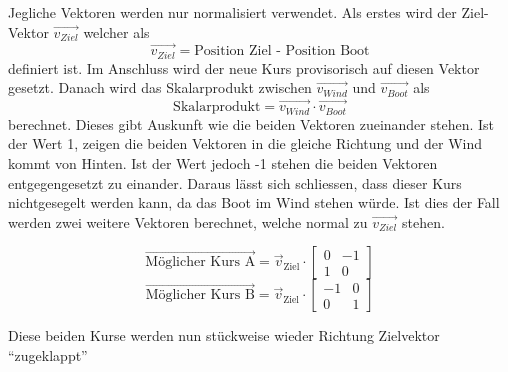 Jegliche Vektoren werden nur normalisiert verwendet. Als erstes wird der Ziel-Vektor $\Vec{v_{Ziel}}$ welcher als $$\Vec{v_{Ziel}} = \text{Position Ziel - Position Boot}$$ definiert ist. Im Anschluss wird der neue Kurs provisorisch auf diesen Vektor gesetzt.
Danach wird das Skalarprodukt zwischen $\Vec{v_{Wind}}$ und $\Vec{v_{Boot}}$ als $$\text{Skalarprodukt} = \Vec{v_{Wind}} \cdot \Vec{v_{Boot}}$$ berechnet. Dieses gibt Auskunft wie die beiden Vektoren zueinander stehen. Ist der Wert 1, zeigen die beiden Vektoren in die gleiche Richtung und der Wind kommt von Hinten. Ist der Wert jedoch -1 stehen die beiden Vektoren entgegengesetzt zu einander. Daraus lässt sich schliessen, dass dieser Kurs nichtgesegelt werden kann, da das Boot im Wind stehen würde. Ist dies der Fall werden zwei weitere Vektoren berechnet, welche normal zu $\Vec{v_{Ziel}}$ stehen. 

$$\vec{\text{Möglicher Kurs A}} = \vec{v}_{\text{Ziel}}  \cdot \begin{bmatrix}0 & -1 \\ 1 & 0\end{bmatrix} $$
$$\vec{\text{Möglicher Kurs B}} = \vec{v}_{\text{Ziel}} \cdot \begin{bmatrix}-1 & 0 \\ 0 & 1\end{bmatrix} $$

Diese beiden Kurse werden nun stückweise wieder Richtung Zielvektor \enquote{zugeklappt} 

